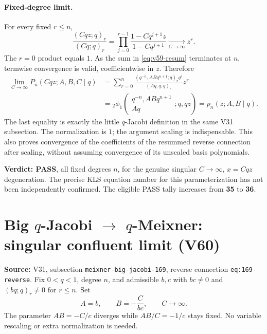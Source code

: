 \documentclass[11pt]{article}
\begin{document}
\paragraph{Fixed-degree limit.}
For every fixed $r\le n$,
\begin{equation}\label{eq:v59-ratio}
 \frac{(Cqz;q)_r}{(Cq;q)_r}
 =\prod_{j=0}^{r-1}\frac{1-Cq^{j+1}z}{1-Cq^{j+1}}
 \xrightarrow[C\to\infty]{}z^r.
\end{equation}
The $r=0$ product equals $1$. As the sum in \eqref{eq:v59-resum} terminates at $n$, termwise convergence is valid, coefficientwise in $z$. Therefore
\begin{align}
 \lim_{C\to\infty}P_n(Cqz;A,B,C\mid q)
 &=\sum_{r=0}^{n}\frac{(q^{-n},ABq^{n+1};q)_r q^r}{(Aq,q;q)_r}z^r\\
 &={}_2\phi_1\!\left(\begin{matrix}q^{-n},ABq^{n+1}\\Aq\end{matrix};q,qz\right)
 =p_n(z;A,B\mid q).
\end{align}
The last equality is exactly the little $q$-Jacobi definition in the same V31 subsection. The normalization is $1$; the argument scaling is indispensable. This also proves convergence of the coefficients of the resummed reverse connection after scaling, without assuming convergence of its unscaled basis polynomials.

\noindent\textbf{Verdict: PASS}, all fixed degrees $n$, for the genuine singular $C\to\infty$, $x=Cqz$ degeneration. The precise KLS equation number for this parameterization has not been independently confirmed. The eligible PASS tally increases from \textbf{35} to \textbf{36}.

\section{Big $q$-Jacobi $\to$ $q$-Meixner: singular confluent limit (V60)}
\noindent\textbf{Source:} V31, subsection \texttt{meixner-big-jacobi-169}, reverse connection \texttt{eq:169-reverse}. Fix $0<q<1$, degree $n$, and admissible $b,c$ with $bc\ne0$ and $(bq;q)_r\ne0$ for $r\le n$. Set
\begin{equation}\label{eq:v60-path}
 A=b,\qquad B=-\frac{C}{bc},\qquad C\longrightarrow\infty.
\end{equation}
The parameter $AB=-C/c$ diverges while $AB/C=-1/c$ stays fixed. No variable rescaling or extra normalization is needed.
\end{document}
